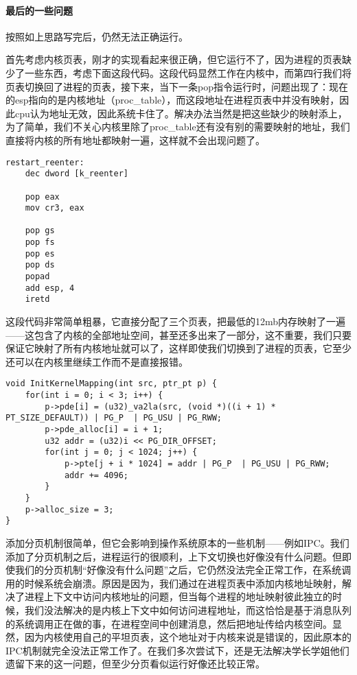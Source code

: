 \documentclass{whureport}
\begin{document}
\paragraph{最后的一些问题} 按照如上思路写完后，仍然无法正确运行。

首先考虑内核页表，刚才的实现看起来很正确，但它运行不了，因为进程的页表缺少了一些东西，考虑下面这段代码。这段代码显然工作在内核中，而第四行我们将页表切换回了进程的页表，接下来，当下一条pop指令运行时，问题出现了：现在的esp指向的是内核地址（proc\_table），而这段地址在进程页表中并没有映射，因此cpu认为地址无效，因此系统卡住了。解决办法当然是把这些缺少的映射添上，为了简单，我们不关心内核里除了proc\_table还有没有别的需要映射的地址，我们直接将内核的所有地址都映射一遍，这样就不会出现问题了。

\begin{lstlisting}
restart_reenter:
	dec	dword [k_reenter]

	pop eax
	mov cr3, eax

	pop	gs
	pop	fs
	pop	es
	pop	ds
	popad
	add	esp, 4
	iretd
\end{lstlisting}

这段代码非常简单粗暴，它直接分配了三个页表，把最低的12mb内存映射了一遍——这包含了内核的全部地址空间，甚至还多出来了一部分，这不重要，我们只要保证它映射了所有内核地址就可以了，这样即使我们切换到了进程的页表，它至少还可以在内核里继续工作而不是直接报错。

\begin{lstlisting}
void InitKernelMapping(int src, ptr_pt p) {
    for(int i = 0; i < 3; i++) {
        p->pde[i] = (u32)_va2la(src, (void *)((i + 1) * PT_SIZE_DEFAULT)) | PG_P  | PG_USU | PG_RWW;
        p->pde_alloc[i] = i + 1;
        u32 addr = (u32)i << PG_DIR_OFFSET;
        for(int j = 0; j < 1024; j++) {
            p->pte[j + i * 1024] = addr | PG_P  | PG_USU | PG_RWW;
            addr += 4096;
        }
    }
    p->alloc_size = 3;
}
\end{lstlisting}


添加分页机制很简单，但它会影响到操作系统原本的一些机制——例如IPC。我们添加了分页机制之后，进程运行的很顺利，上下文切换也好像没有什么问题。但即使我们的分页机制“好像没有什么问题”之后，它仍然没法完全正常工作，在系统调用的时候系统会崩溃。原因是因为，我们通过在进程页表中添加内核地址映射，解决了进程上下文中访问内核地址的问题，但当每个进程的地址映射彼此独立的时候，我们没法解决的是内核上下文中如何访问进程地址，而这恰恰是基于消息队列的系统调用正在做的事，在进程空间中创建消息，然后把地址传给内核空间。显然，因为内核使用自己的平坦页表，这个地址对于内核来说是错误的，因此原本的IPC机制就完全没法正常工作了。在我们多次尝试下，还是无法解决学长学姐他们遗留下来的这一问题，但至少分页看似运行好像还比较正常。
\end{document}
